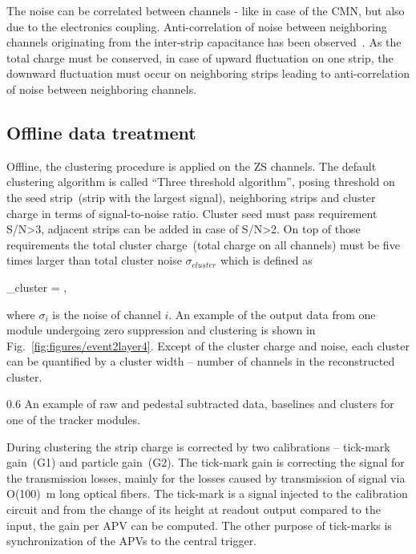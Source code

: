 The noise can be correlated between channels - like in case of the CMN, but also due to the electronics coupling. Anti-correlation of noise between neighboring channels originating from the inter-strip capacitance has been observed~\cite{Lutz:1987wd}. As the total charge must be conserved, in case of upward fluctuation on one strip, the downward fluctuation must occur on neighboring strips leading to anti-correlation of noise between neighboring channels.

\subsection{Offline data treatment}


Offline, the clustering procedure is applied on the ZS channels. The default clustering algorithm is called ``Three threshold algorithm'', posing threshold on the seed strip~(strip with the largest signal), neighboring strips and cluster charge in terms of signal-to-noise ratio. Cluster seed must pass requirement S/N>3, adjacent strips can be added in case of S/N>2. On top of those requirements the total cluster charge~(total charge on all channels) must be five times larger than total cluster noise $\sigma_{cluster}$ which is defined as

{
    \sigma_{cluster} = ,
}

where $\sigma_{i}$ is the noise of channel $i$. An example of the output data from one module undergoing zero suppression and clustering is shown in Fig.~\ref{fig:figures/event2layer4}. Except of the cluster charge and noise, each cluster can be quantified by a cluster width -- number of channels in the reconstructed cluster.

                 {0.6}       %
                 {An example of raw and pedestal subtracted data, baselines and clusters for one of the tracker modules.} %

During clustering the strip charge is corrected by two calibrations -- tick-mark gain~(G1) and particle gain~(G2). The tick-mark gain is correcting the signal for the transmission losses, mainly for the losses caused by transmission of signal via O(100)~m long optical fibers. The tick-mark is a signal injected to the calibration circuit and from the change of its height at readout output compared to the input, the gain per APV can be computed. The other purpose of tick-marks is synchronization of the APVs to the central trigger.

